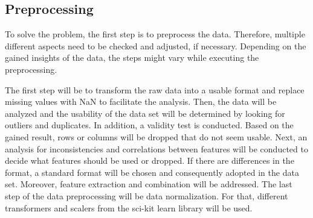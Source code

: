 \documentclass[11pt,titlepage,oneside,openany]{book}
\begin{document}
\subsection{Preprocessing}
%
%
%
To solve the problem, the first step is to preprocess the data. Therefore, multiple different aspects need to be checked and adjusted, if necessary. Depending on the gained insights of the data, the steps might vary while executing the preprocessing. 

The first step will be to transform the raw data into a usable format and replace missing values with NaN to facilitate the analysis.
Then, the data will be analyzed and the usability of the data set will be determined by looking for outliers and duplicates. In addition, a validity test is conducted. Based on the gained result, rows or columns will be dropped that do not seem usable. 
Next, an analysis for inconsistencies and correlations between features will be conducted to decide what features should be used or dropped. If there are differences in the format, a standard format will be chosen and consequently adopted in the data set.
Moreover, feature extraction and combination will be addressed. 
The last step of the data preprocessing will be data normalization. For that, different transformers and scalers from the sci-kit learn library will be used.
\end{document}
